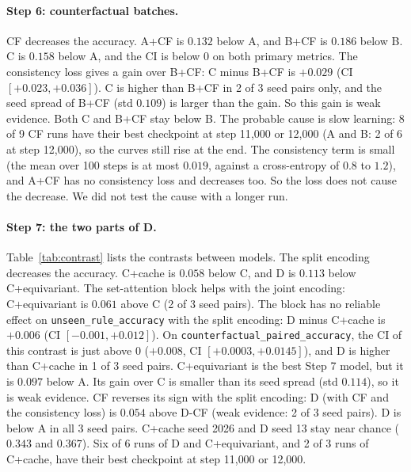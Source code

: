 \documentclass[11pt,a4paper]{article}
\newcommand{\ura}{\texttt{unseen\_\allowbreak rule\_\allowbreak accuracy}}
\newcommand{\cpa}{\texttt{counterfactual\_\allowbreak paired\_\allowbreak accuracy}}
\begin{document}
\paragraph{Step 6: counterfactual batches.}
CF decreases the accuracy.
A+CF is $0.132$ below A, and B+CF is $0.186$ below B.
C is $0.158$ below A, and the CI is below 0 on both primary metrics.
The consistency loss gives a gain over B+CF: C minus B+CF is $+0.029$ (CI $[+0.023, +0.036]$).
C is higher than B+CF in 2 of 3 seed pairs only, and the seed spread of B+CF (std $0.109$) is larger than the gain.
So this gain is weak evidence.
Both C and B+CF stay below B.
The probable cause is slow learning: 8 of 9 CF runs have their best checkpoint at step 11{,}000 or 12{,}000 (A and B: 2 of 6 at step 12{,}000), so the curves still rise at the end.
The consistency term is small (the mean over 100 steps is at most $0.019$, against a cross-entropy of $0.8$ to $1.2$), and A+CF has no consistency loss and decreases too.
So the loss does not cause the decrease.
We did not test the cause with a longer run.

\paragraph{Step 7: the two parts of D.}
Table~\ref{tab:contrast} lists the contrasts between models.
The split encoding decreases the accuracy.
C+cache is $0.058$ below C, and D is $0.113$ below C+equivariant.
The set-attention block helps with the joint encoding: C+equivariant is $0.061$ above C (2 of 3 seed pairs).
The block has no reliable effect on \ura{} with the split encoding: D minus C+cache is $+0.006$ (CI $[-0.001, +0.012]$).
On \cpa{}, the CI of this contrast is just above 0 ($+0.008$, CI $[+0.0003, +0.0145]$), and D is higher than C+cache in 1 of 3 seed pairs.
C+equivariant is the best Step 7 model, but it is $0.097$ below A.
Its gain over C is smaller than its seed spread (std $0.114$), so it is weak evidence.
CF reverses its sign with the split encoding: D (with CF and the consistency loss) is $0.054$ above D-CF (weak evidence: 2 of 3 seed pairs).
D is below A in all 3 seed pairs.
C+cache seed 2026 and D seed 13 stay near chance ($0.343$ and $0.367$).
Six of 6 runs of D and C+equivariant, and 2 of 3 runs of C+cache, have their best checkpoint at step 11{,}000 or 12{,}000.
\end{document}
